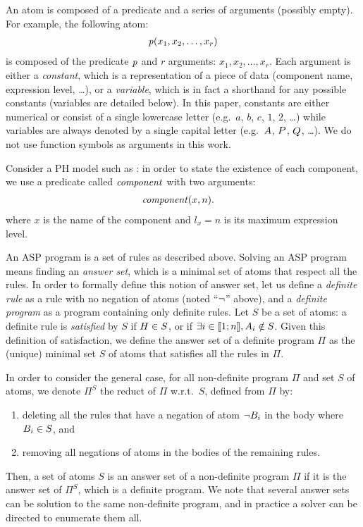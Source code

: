 An atom is composed of a predicate and a series of arguments (possibly empty).
For example, the following atom:
\begin{align*}
  \mathit{p}(x_1, x_2, \dots, x_r)
\end{align*}
is composed of the predicate $\mathit{p}$ and $r$ arguments: $x_1, x_2, \dots, x_r$.
Each argument is either a \emph{constant}, which is a representation of a piece of data (component name, expression level, …),
or a \emph{variable}, which is in fact a shorthand for any possible constants (variables are detailed below).
In this paper, constants are either numerical or consist of a single lowercase letter (e.g.~$a$, $b$, $c$, $1$, $2$, …)
while variables are always denoted by a single capital letter (e.g.~$A$, $P$, $Q$, …).
We do not use function symbols as arguments in this work.

\begin{example}\label{ex:asp-atom}
Consider a PH model such as :
in order to state the existence of each component, we use a predicate called $\mathit{component}$ with two arguments:
\begin{align*}
  &\mathit{component}(x, n).
\end{align*}
where $x$ is the name of the component and $l_x = n$ is its maximum expression level.
\end{example}

An ASP program is a set of rules as described above.
Solving an ASP program means finding an \emph{answer set}, which is a minimal set of atoms that respect all the rules.
In order to formally define this notion of answer set,
let us define a \emph{definite rule} as a rule with no negation of atoms (noted “$\neg$” above),
and a \emph{definite program} as a program containing only definite rules.
Let $S$ be a set of atoms: a definite rule is \emph{satisfied} by $S$ if $H \in S$,
or if $\exists i \in \llbracket 1 ; n \rrbracket, A_i \notin S$.
Given this definition of satisfaction, we define the answer set of a definite program $\Pi$
as the (unique) minimal set $S$ of atoms that satisfies all the rules in $\Pi$.

In order to consider the general case,
for all non-definite program $\Pi$ and set $S$ of atoms, we denote $\Pi^S$ the reduct of $\Pi$ w.r.t.~$S$, defined from $\Pi$ by:
\begin{enumerate}
  \item deleting all the rules that have a negation of atom $\neg B_i$ in the body where $B_i \in S$, and
  \item removing all negations of atoms in the bodies of the remaining rules.
\end{enumerate}
Then, a set of atoms $S$ is an answer set of a non-definite program $\Pi$ if it is the answer set of $\Pi^S$, which is a definite program.
We note that several answer sets can be solution to the same non-definite program, and in practice a solver can be directed to enumerate them all.

